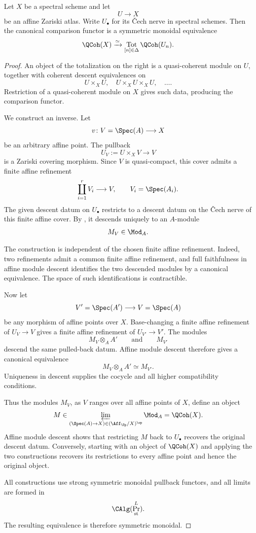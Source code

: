 \begin{theorem}
\label{thm:qcoh-atlas-computation}
Let $X$ be a spectral scheme and let
\[
    U
    \longrightarrow
    X
\]
be an affine Zariski atlas. Write $U_\bullet$ for its \v{C}ech nerve in
spectral schemes. Then the canonical comparison functor is a symmetric
monoidal equivalence
\[
    \QCoh(X)
    \xrightarrow{\simeq}
    \operatorname*{Tot}_{[n]\in\Delta}
    \QCoh(U_n).
\]
\end{theorem}

\begin{proof}
An object of the totalization on the right is a quasi-coherent module on
$U$, together with coherent descent equivalences on
\[
    U\times_XU,
    \quad
    U\times_XU\times_XU,
    \quad\ldots.
\]
Restriction of a quasi-coherent module on $X$ gives such data, producing
the comparison functor.

We construct an inverse. Let
\[
    v
    \colon
    V=\Spec(A)
    \longrightarrow
    X
\]
be an arbitrary affine point. The pullback
\[
    U_V
    :=
    U\times_XV
    \longrightarrow
    V
\]
is a Zariski covering morphism. Since $V$ is quasi-compact, this cover
admits a finite affine refinement
\[
    \coprod_{i=1}^r
    V_i
    \longrightarrow
    V,
    \qquad
    V_i=\Spec(A_i).
\]
The given descent datum on $U_\bullet$ restricts to a descent datum on the
\v{C}ech nerve of this finite affine cover. By
, it descends uniquely to an
$A$-module
\[
    M_V
    \in
    \Mod_A.
\]

The construction is independent of the chosen finite affine refinement.
Indeed, two refinements admit a common finite affine refinement, and
full faithfulness in affine module descent identifies the two descended
modules by a canonical equivalence. The space of such identifications is
contractible.

Now let
\[
    V'=\Spec(A')
    \longrightarrow
    V=\Spec(A)
\]
be any morphism of affine points over $X$. Base-changing a finite affine
refinement of $U_V\to V$ gives a finite affine refinement of
$U_{V'}\to V'$. The modules
\[
    M_V\otimes_AA'
    \qquad\text{and}\qquad
    M_{V'}
\]
descend the same pulled-back datum. Affine module descent therefore gives
a canonical equivalence
\[
    M_V\otimes_AA'
    \simeq
    M_{V'}.
\]
Uniqueness in descent supplies the cocycle and all higher compatibility
conditions.

Thus the modules $M_V$, as $V$ ranges over all affine points of $X$,
define an object
\[
    M
    \in
    \varprojlim_
    {(\Spec(A)\to X)
    \in
    (\Aff_{\Sp}/X)^{\op}}
    \Mod_A
    =
    \QCoh(X).
\]
Affine module descent shows that restricting $M$ back to $U_\bullet$
recovers the original descent datum. Conversely, starting with an object
of $\QCoh(X)$ and applying the two constructions recovers its restrictions
to every affine point and hence the original object.

All constructions use strong symmetric monoidal pullback functors, and
all limits are formed in
\[
    \CAlg(\Pr^L_{\mathrm{st}}).
\]
The resulting equivalence is therefore symmetric monoidal.
\end{proof}

